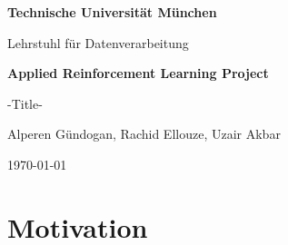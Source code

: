 \documentclass[12pt,a4paper]{article}
\newcommand{\setlang}[1]{\selectlanguage{#1}\nonfrenchspacing}
\begin{document}
\thispagestyle{empty}
\newpage

\vspace{5cm}

\parbox{15cm}{\begin{center} {\sf\bf 
                               \Large  Technische Universität München
                                \smallskip

                               \Large Lehrstuhl für Datenverarbeitung
                               \smallskip
                              }

                            
              \end{center}}  %

\vspace{5cm}

\begin{center}
        {\bf\Huge Applied Reinforcement Learning Project} %
\end{center}

\begin{center}
        \settowidth{\baselineskip}{0.4cm}
        {\LARGE 
		-Title-
	    \vspace*{3.5cm}
        }
\end{center}

\begin{center}
\LARGE Alperen Gündogan, Rachid Ellouze, Uzair Akbar
\end{center}

\begin{center}
\large\today
\end{center}

\vspace*{3.2cm}
\begin{center}
    \epsfxsize=3cm
    \hspace*{9cm}
    \epsfxsize=3cm
\end{center}




%

\setlang{english}
\thispagestyle{plain}

\section{Motivation}
\end{document}
